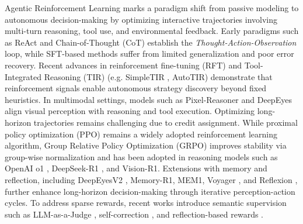 \documentclass[sigconf]{acmart}
\begin{document}
Agentic Reinforcement Learning \cite{DBLP:journals/tmlr/ZhangGYYZTZLXLZCZFWHVLW26, DBLP:journals/corr/abs-2510-04206} marks a paradigm shift from passive modeling to autonomous decision-making by optimizing interactive trajectories involving multi-turn reasoning, tool use, and environmental feedback. Early paradigms such as ReAct \cite{DBLP:conf/iclr/YaoZYDSN023} and Chain-of-Thought (CoT) \cite{DBLP:conf/nips/Wei0SBIXCLZ22} establish the \textit{Thought-Action-Observation} loop, while SFT-based methods \cite{DBLP:conf/iclr/QinLYZYLLCTQZHT24} suffer from limited generalization and poor error recovery. Recent advances in reinforcement fine-tuning (RFT) and Tool-Integrated Reasoning (TIR) (e.g. SimpleTIR \cite{DBLP:journals/corr/abs-2509-02479}, AutoTIR\cite{DBLP:journals/corr/abs-2507-21836}) demonstrate that reinforcement signals enable autonomous strategy discovery beyond fixed heuristics. In multimodal settings, models such as Pixel-Reasoner\cite{DBLP:journals/corr/abs-2505-15966} and DeepEyes \cite{DBLP:journals/corr/abs-2505-14362} align visual perception with reasoning and tool execution. Optimizing long-horizon trajectories remains challenging due to credit assignment. While proximal policy optimization (PPO) \cite{DBLP:journals/corr/SchulmanWDRK17} remains a widely adopted reinforcement learning algorithm,  Group Relative Policy Optimization (GRPO) \cite{DBLP:journals/corr/abs-2402-03300} improves stability via group-wise normalization and has been adopted in reasoning models such as OpenAI o1 \cite{DBLP:journals/corr/abs-2412-16720}, DeepSeek-R1 \cite{DBLP:journals/corr/abs-2501-12948}, and Vision-R1\cite{DBLP:journals/corr/abs-2503-06749}. Extensions with memory and reflection, including DeepEyesV2 \cite{DBLP:journals/corr/abs-2511-05271}, Memory-R1\cite{DBLP:journals/corr/abs-2508-19828}, MEM1\cite{DBLP:journals/corr/abs-2506-15841}, Voyager \cite{DBLP:journals/tmlr/WangX0MXZFA24}, and Reflexion \cite{DBLP:conf/nips/ShinnCGNY23}, further enhance long-horizon decision-making through iterative perception-action cycles. To address sparse rewards, recent works introduce semantic supervision such as LLM-as-a-Judge \cite{DBLP:conf/nips/ZhengC00WZL0LXZ23}, self-correction \cite{DBLP:journals/corr/abs-2308-03188, DBLP:journals/corr/abs-2603-07433, DBLP:conf/icml/Yang0SZ25}, and reflection-based rewards \cite{DBLP:conf/nips/ShinnCGNY23}. 
\end{document}

